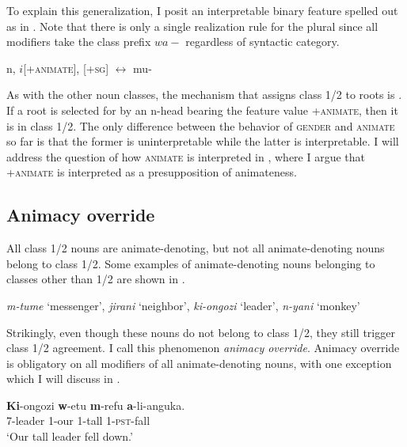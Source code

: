\documentclass[output=paper,newtxmath,modfonts,nonflat,hidelinks]{langsci/langscibook}
\begin{document}
To explain this generalization, I posit an interpretable binary  feature spelled out as in . Note that there is only a single realization rule for the plural since all modifiers take the class prefix $wa-$ regardless of syntactic category.

\ea\label{ex:pesetsky:howtobeanimate} \ea\label{ex:pesetsky:howtobeanimatea}{ n, $i$[+\textsc{animate}], [\textsc{+sg}] $\longleftrightarrow$ mu-}
 \label{ex:pesetsky:howtobeanimateb}
  \z \z

As with the other noun classes, the mechanism that assigns class 1/2 to roots is .  If a root is selected for by an n-head bearing the feature value +\textsc{animate}, then it is in class 1/2.  The only difference between the behavior of \textsc{gender} and \textsc{animate} so far is that the former is uninterpretable while the latter is interpretable. I will address the question of how \textsc{animate} is interpreted in , where I argue that +\textsc{animate} is interpreted as a presupposition of animateness.


\subsection{Animacy override} \label{sec:pesetsky:animateoverridesubsection}

All class 1/2 nouns are animate-denoting, but not all animate-denoting nouns belong to class 1/2.  Some examples of animate-denoting nouns belonging to classes other than 1/2 are shown in .

\ea\label{ex:pesetsky:cryptoanimates}{\textit{m-tume} `messenger', \textit{jirani} `neighbor', \textit{ki-ongozi} `leader', \textit{n-yani} `monkey'} \z

Strikingly, even though these nouns do not belong to class 1/2, they still trigger class 1/2 agreement. I call this phenomenon \textit{animacy override}. Animacy override is obligatory on all modifiers of all animate-denoting nouns, with one exception which I will discuss in .

 \ea\label{ex:pesetsky:kiongozeh} 
 \ea\label{ex:pesetsky:kiongozia}{
 \gll \textbf{Ki}-ongozi \textbf{w}-etu \textbf{m}-refu \textbf{a}-li-anguka. \\
     \textsc{7}-leader \textsc{1}-our \textsc{1}-tall \textsc{1}-\textsc{pst}-fall \\ 
     \glt `Our tall leader fell down.'
     } 
\z \z     
     
\end{document}
